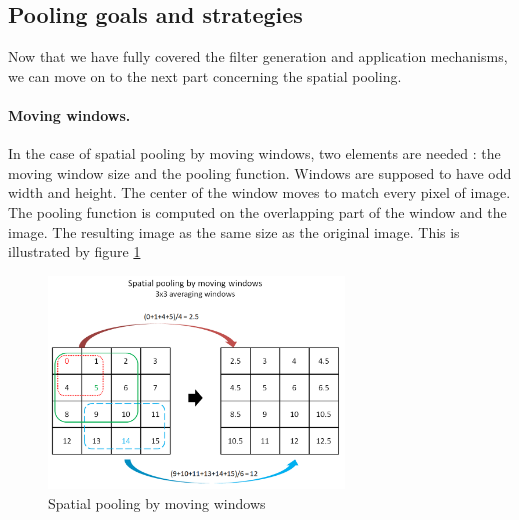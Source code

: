 \documentclass[a4paper]{report}
\begin{document}
		\subsection{Pooling goals and strategies}
		Now that we have fully covered the filter generation and application mechanisms, we can move on to the next part concerning the spatial pooling.
			\paragraph{Moving windows.}
			In the case of spatial pooling by moving windows, two elements are needed : the moving window size and the pooling function. Windows are supposed to have odd width and height. The center of the window moves to match every pixel of image. The pooling function is computed on the overlapping part of the window and the image. The resulting image as the same size as the original image. This is illustrated by figure \ref{fig:PoolMW}
	\begin{figure}
		\centering
			\includegraphics[width=0.7\textwidth]{images/PoolMW.png}
		\caption{\label{fig:PoolMW}Spatial pooling by moving windows}
	\end{figure}
			
\end{document}
